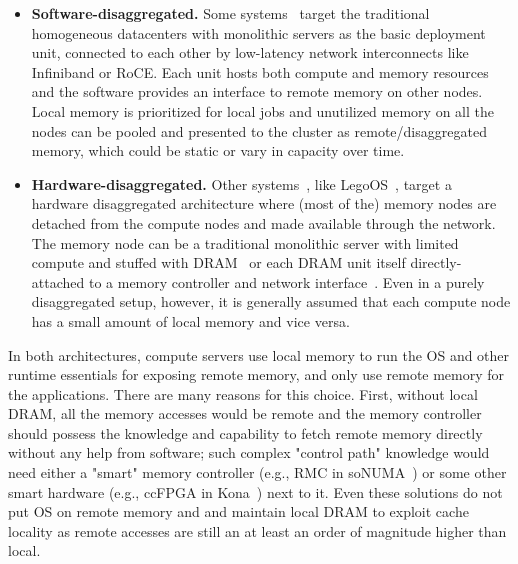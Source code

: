 \begin{itemize}
    \item \textbf{Software-disaggregated.}
    Some systems~\cite{gms,cashmere,infiniswap,remregions,
    leap,zswap} target the traditional homogeneous 
    datacenters with monolithic servers as the basic 
    deployment unit, connected to each other by low-latency 
    network interconnects like Infiniband or RoCE. Each 
    unit hosts both compute and memory resources and the 
    software provides an interface to remote memory 
    on other nodes. Local memory is prioritized for 
    local jobs and unutilized memory on all the nodes 
    can be pooled and presented to the cluster as 
    remote/disaggregated memory, which could be static 
    or vary in capacity over time. 

    \item \textbf{Hardware-disaggregated.}
    Other systems~\cite{kona,aifm,fastswap,semeru}, like 
    LegoOS~\cite{legoos}, target a 
    hardware disaggregated architecture where (most of the) 
    memory nodes are detached from the compute nodes and 
    made available through the network. The memory node 
    can be a traditional monolithic server with limited 
    compute and stuffed with DRAM~\cite{fastswap} or 
    each DRAM unit itself directly-attached to a memory 
    controller and network interface~\cite{legoos}. 
    Even in a purely disaggregated setup, however, 
    it is generally assumed that each compute node has 
    a small amount of local memory and vice 
    versa.~\cite{legoos,kona}
\end{itemize}

In both architectures, compute servers use local memory 
to run the OS and other runtime essentials for exposing remote 
memory, and only use remote memory for the applications. 
There are many reasons for this choice. 
First, without local DRAM, all the memory 
accesses would be remote and the memory controller should 
possess the knowledge and capability to fetch remote memory 
directly without any help from software; such complex "control 
path" knowledge would need either a "smart" memory controller 
(e.g., RMC in soNUMA~\cite{sonuma}) or some other smart 
hardware (e.g., ccFPGA in Kona~\cite{kona}) next to it. 
Even these solutions do not put OS on remote memory and 
and maintain local DRAM to exploit cache locality as remote 
accesses are still an at least an order of magnitude higher 
than local.

